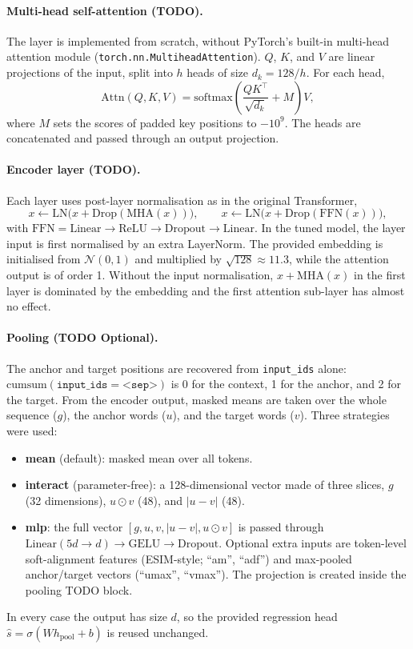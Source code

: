 \documentclass[11pt,a4paper]{article}
\begin{document}
\paragraph{Multi-head self-attention (TODO).}
The layer is implemented from scratch, without PyTorch's built-in
multi-head attention module (\texttt{torch.nn.\allowbreak MultiheadAttention}). $Q$, $K$, and $V$ are linear
projections of the input, split into $h$ heads of size $d_k=128/h$.
For each head,
\[
\mathrm{Attn}(Q,K,V)=\mathrm{softmax}\!\left(\frac{QK^\top}{\sqrt{d_k}}+M\right)V,
\]
where $M$ sets the scores of padded key positions to $-10^{9}$. The
heads are concatenated and passed through an output projection.

\paragraph{Encoder layer (TODO).}
Each layer uses post-layer normalisation as in the original Transformer,
\[
x \leftarrow \mathrm{LN}\big(x+\mathrm{Drop}(\mathrm{MHA}(x))\big),\qquad
x \leftarrow \mathrm{LN}\big(x+\mathrm{Drop}(\mathrm{FFN}(x))\big),
\]
with $\mathrm{FFN}=\mathrm{Linear}\rightarrow\mathrm{ReLU}\rightarrow\mathrm{Dropout}\rightarrow\mathrm{Linear}$.
In the tuned model, the layer input is first normalised by an extra
LayerNorm. The provided embedding is initialised from $\mathcal N(0,1)$
and multiplied by $\sqrt{128}\approx11.3$, while the attention output
is of order 1. Without the input normalisation, $x+\mathrm{MHA}(x)$ in
the first layer is dominated by the embedding and the first attention
sub-layer has almost no effect.

\paragraph{Pooling (TODO Optional).}
The anchor and target positions are recovered from \texttt{input\_ids}
alone: $\mathrm{cumsum}(\texttt{input\_ids}=\texttt{<sep>})$ is 0 for
the context, 1 for the anchor, and 2 for the target. From the encoder
output, masked means are taken over the whole sequence ($g$), the anchor
words ($u$), and the target words ($v$). Three strategies were used:
\begin{itemize}
    \item \textbf{mean} (default): masked mean over all tokens.
    \item \textbf{interact} (parameter-free): a 128-dimensional vector
          made of three slices, $g$ (32 dimensions), $u\odot v$ (48), and
          $|u-v|$ (48).
    \item \textbf{mlp}: the full vector $[g,u,v,|u-v|,u\odot v]$ is
          passed through $\mathrm{Linear}(5d\rightarrow d)\rightarrow
          \mathrm{GELU}\rightarrow\mathrm{Dropout}$. Optional extra
          inputs are token-level soft-alignment features
          (ESIM-style; ``am'', ``adf'') and max-pooled anchor/target
          vectors (``umax'', ``vmax''). The projection is created inside
          the pooling TODO block.
\end{itemize}
In every case the output has size $d$, so the provided regression head
$\hat s=\sigma(Wh_{\text{pool}}+b)$ is reused unchanged.
\end{document}
